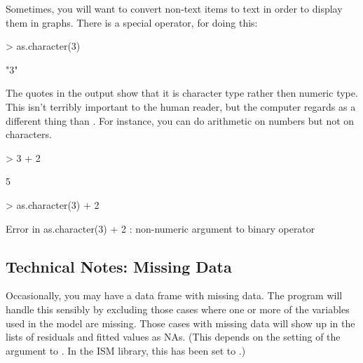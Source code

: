  Sometimes, you will want to convert
non-text items to text in order to display them in graphs.  There is a
special operator,  for doing this:
\begin{Schunk}
\begin{Sinput}
> as.character(3)
\end{Sinput}
\begin{Soutput}
[1] "3"
\end{Soutput}
\end{Schunk}
The quotes in the output show that it is character type rather then
numeric type.  This isn't terribly important to the human reader, but
the computer regards  as a different thing than .
For instance, you can do arithmetic on numbers but not on characters.
\begin{Schunk}
\begin{Sinput}
> 3 + 2
\end{Sinput}
\begin{Soutput}
[1] 5
\end{Soutput}
\end{Schunk}
\begin{Schunk}
\begin{Sinput}
> as.character(3) + 2
\end{Sinput}
\end{Schunk}
\begin{Schunk}
\begin{Soutput}
Error in as.character(3) + 2 : non-numeric argument to binary operator
\end{Soutput}
\end{Schunk}




\subsection{Technical Notes: Missing Data}


Occasionally, you may have a data frame with missing data.  The
 program will handle this sensibly by excluding those cases
where one or more of the variables used in the model are missing.
Those cases with missing data will show up in the lists of residuals 
and fitted values as NAs. (This depends on the
setting of the  argument to .  In the ISM
library, this has been set to .)


